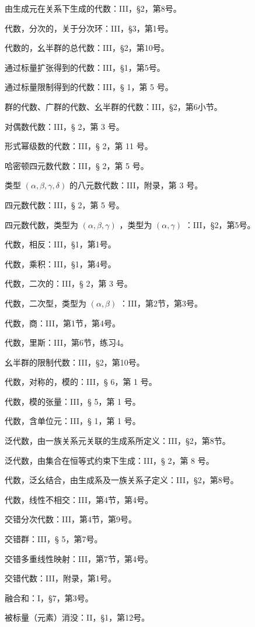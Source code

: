 由生成元在关系下生成的代数：III，§2，第8号。

代数，分次的，关于分次环：III，§3，第1号。

代数的，幺半群的总代数：III，§2，第10号。

通过标量扩张得到的代数：III，§1，第5号。

通过标量限制得到的代数：III，§ 1，第 5 号。

群的代数、广群的代数、幺半群的代数：III，§2，第6小节。

对偶数代数：III，§ 2，第 3 号。

形式幂级数的代数：III，§ 2，第 11 号。

哈密顿四元数代数：III，§ 2，第 5 号。

类型 \((\alpha, \beta, \gamma, \delta)\) 的八元数代数：III，附录，第 3 号。

四元数代数：III，§ 2，第 5 号。

四元数代数，类型为 \((\alpha, \beta, \gamma)\) ，类型为 \((\alpha, \gamma)\) ：III，§2，第5号。

代数，相反：III，§1，第1号。

代数，乘积：III，§1，第4号。

代数，二次的：III，§ 2，第 3 号。

代数，二次型，类型为 \((\alpha, \beta)\) ：III，第2节，第3号。

代数，商：III，第1节，第4号。

代数，里斯：III，第6节，练习4。

幺半群的限制代数：III，§2，第10号。

代数，对称的，模的：III，§ 6，第 1 号。

代数，模的张量：III，§ 5，第 1 号。

代数，含单位元：III，§ 1，第 1 号。

泛代数，由一族关系元关联的生成系所定义：III，§2，第8节。

泛代数，由集合在恒等式约束下生成：III，§ 2，第 8 号。

代数，泛幺结合，由生成系及一族关系子定义：III，§2，第8号。

代数，线性不相交：III，第4节，第4号。

交错分次代数：III，第4节，第9号。

交错群：III，§ 5，第7号。

交错多重线性映射：III，第7节，第4号。

交错代数：III，附录，第1号。

融合和：I，§7，第3号。

被标量（元素）消没：II，§1，第12号。

